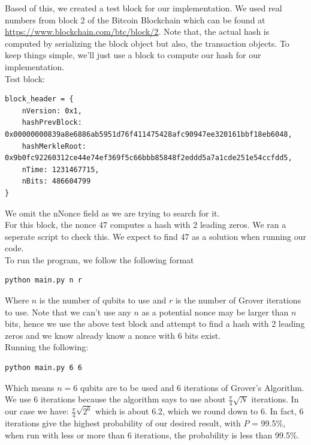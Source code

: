 \documentclass[11pt]{article} %
\begin{document}
\noindent Based of this, we created a test block for our implementation. We used real numbers from block 2 of the Bitcoin Blockchain which can be found at \url{https://www.blockchain.com/btc/block/2}. Note that, the actual hash is computed by serializing the block object but also, the transaction objects. To keep things simple, we'll just use a block to compute our hash for our implementation.\\

\noindent Test block:
\begin{verbatim}
block_header = {
    nVersion: 0x1,
    hashPrevBlock: 0x00000000839a8e6886ab5951d76f411475428afc90947ee320161bbf18eb6048,
    hashMerkleRoot: 0x9b0fc92260312ce44e74ef369f5c66bbb85848f2eddd5a7a1cde251e54ccfdd5,
    nTime: 1231467715,
    nBits: 486604799
}
\end{verbatim}

\noindent We omit the nNonce field as we are trying to search for it.\\

\noindent For this block, the nonce 47 computes a hash with 2 leading zeros. We ran a seperate script to check this. We expect to find 47 as a solution when running our code.\\

\noindent To run the program, we follow the following format
\begin{verbatim}
python main.py n r
\end{verbatim}

\noindent Where $n$ is the number of qubits to use and $r$ is the number of Grover iterations to use. Note that we can't use any $n$ as a potential nonce may be larger than $n$ bits, hence we use the above test block and attempt to find a hash with 2 leading zeros and we know already know a nonce with 6 bits exist.\\

\noindent Running the following:


\begin{verbatim}
python main.py 6 6
\end{verbatim}

\noindent Which means $n = 6$ qubits are to be used and 6 iterations of Grover's Algorithm. We use 6 iterations because the algorithm says to use about $\frac{\pi}{4} \sqrt{N}$ iterations. In our case we have: $\frac{\pi}{4} \sqrt{2^6}$ which is about 6.2, which we round down to 6. In fact, 6 iterations give the highest probability of our desired result, with $P$ = 99.5\%, when run with less or more than 6 iterations, the probability is less than 99.5\%. \\
\end{document}
